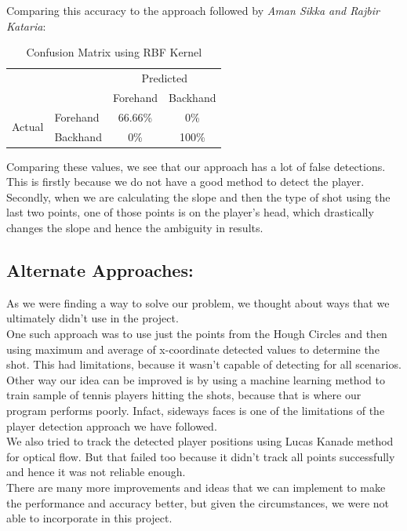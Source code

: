 \documentclass[10.5pt]{proc}
\begin{document}
	Comparing this accuracy to the approach followed by \emph{Aman Sikka and Rajbir Kataria}\cite{stanford2012}:
	\begin{table}[h]
	\caption{Confusion Matrix using RBF Kernel}
	\label{my-label}
	\begin{tabular}{ll|c|c|}
	\cline{3-4}
	                                              &          & \multicolumn{2}{c|}{Predicted}                                \\ \cline{3-4} 
	                                              &          & \multicolumn{1}{l|}{Forehand} & \multicolumn{1}{l|}{Backhand} \\ \hline
	\multicolumn{1}{|c|}{\multirow{2}{*}{Actual}} & Forehand & 66.66\%                          & 0\%                          \\ \cline{2-4} 
	\multicolumn{1}{|c|}{}                        & Backhand & 0\%                          & 100\%                          \\ \hline
	\end{tabular}
	\end{table}

	Comparing these values, we see that our approach has a lot of false detections. This is firstly because we do not have a good method to detect the player. Secondly, when we are calculating the slope and then the type of shot using the last two points, one of those points is on the player's head, which drastically changes the slope and hence the ambiguity in results.

	\subsection{Alternate Approaches:}
	As we were finding a way to solve our problem, we thought about ways that we ultimately didn't use in the project.\\
	One such approach was to use just the points from the Hough Circles and then using maximum and average of x-coordinate detected values to determine the shot. This had limitations, because it wasn't capable of detecting for all scenarios.\\
	Other way our idea can be improved is by using a machine learning method to train sample of tennis players hitting the shots, because that is where our program performs poorly. Infact, sideways faces is one of the limitations of the player detection approach we have followed.\\
	We also tried to track the detected player positions using Lucas Kanade method for optical flow. But that failed too because it didn't track all points successfully and hence it was not reliable enough.\\
	There are many more improvements and ideas that we can implement to make the performance and accuracy better, but given the circumstances, we were not able to incorporate in this project.\\
\end{document}
